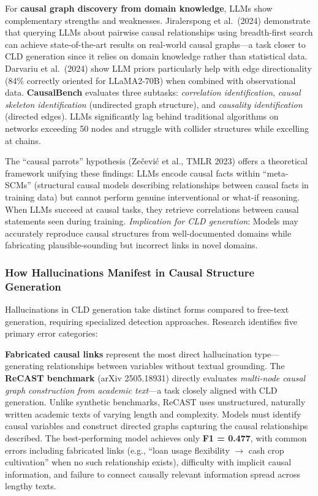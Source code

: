 For \textbf{causal graph discovery from domain knowledge}, LLMs show complementary strengths and weaknesses. Jiralerspong et al.\ (2024) demonstrate that querying LLMs about pairwise causal relationships using breadth-first search can achieve state-of-the-art results on real-world causal graphs---a task closer to CLD generation since it relies on domain knowledge rather than statistical data. Darvariu et al.\ (2024) show LLM priors particularly help with edge directionality (84\% correctly oriented for LLaMA2-70B) when combined with observational data. \textbf{CausalBench} evaluates three subtasks: \textit{correlation identification}, \textit{causal skeleton identification} (undirected graph structure), and \textit{causality identification} (directed edges). LLMs significantly lag behind traditional algorithms on networks exceeding 50 nodes and struggle with collider structures while excelling at chains.

The ``causal parrots'' hypothesis (Zečević et al., TMLR 2023) offers a theoretical framework unifying these findings: LLMs encode causal facts within ``meta-SCMs'' (structural causal models describing relationships between causal facts in training data) but cannot perform genuine interventional or what-if reasoning. When LLMs succeed at causal tasks, they retrieve correlations between causal statements seen during training. \textit{Implication for CLD generation}: Models may accurately reproduce causal structures from well-documented domains while fabricating plausible-sounding but incorrect links in novel domains.

\subsubsection{How Hallucinations Manifest in Causal Structure Generation}

Hallucinations in CLD generation take distinct forms compared to free-text generation, requiring specialized detection approaches. Research identifies five primary error categories:

\textbf{Fabricated causal links} represent the most direct hallucination type---generating relationships between variables without textual grounding. The \textbf{ReCAST benchmark} (arXiv 2505.18931) directly evaluates \textit{multi-node causal graph construction from academic text}---a task closely aligned with CLD generation. Unlike synthetic benchmarks, ReCAST uses unstructured, naturally written academic texts of varying length and complexity. Models must identify causal variables and construct directed graphs capturing the causal relationships described. The best-performing model achieves only \textbf{F1 = 0.477}, with common errors including fabricated links (e.g., ``loan usage flexibility $\rightarrow$ cash crop cultivation'' when no such relationship exists), difficulty with implicit causal information, and failure to connect causally relevant information spread across lengthy texts.

